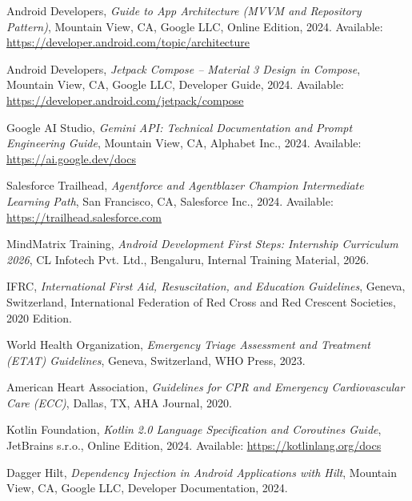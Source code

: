 \documentclass[12pt,a4paper]{report}
\begin{document}
\begin{enumerate}[label={[\arabic*]}, leftmargin=*, itemsep=8pt]
    \item Android Developers, \textit{Guide to App Architecture (MVVM and Repository Pattern)}, Mountain View, CA, Google LLC, Online Edition, 2024. Available: \url{https://developer.android.com/topic/architecture}
    \item Android Developers, \textit{Jetpack Compose -- Material 3 Design in Compose}, Mountain View, CA, Google LLC, Developer Guide, 2024. Available: \url{https://developer.android.com/jetpack/compose}
    \item Google AI Studio, \textit{Gemini API: Technical Documentation and Prompt Engineering Guide}, Mountain View, CA, Alphabet Inc., 2024. Available: \url{https://ai.google.dev/docs}
    \item Salesforce Trailhead, \textit{Agentforce and Agentblazer Champion Intermediate Learning Path}, San Francisco, CA, Salesforce Inc., 2024. Available: \url{https://trailhead.salesforce.com}
    \item MindMatrix Training, \textit{Android Development First Steps: Internship Curriculum 2026}, CL Infotech Pvt. Ltd., Bengaluru, Internal Training Material, 2026.
    \item IFRC, \textit{International First Aid, Resuscitation, and Education Guidelines}, Geneva, Switzerland, International Federation of Red Cross and Red Crescent Societies, 2020 Edition.
    \item World Health Organization, \textit{Emergency Triage Assessment and Treatment (ETAT) Guidelines}, Geneva, Switzerland, WHO Press, 2023.
    \item American Heart Association, \textit{Guidelines for CPR and Emergency Cardiovascular Care (ECC)}, Dallas, TX, AHA Journal, 2020.
    \item Kotlin Foundation, \textit{Kotlin 2.0 Language Specification and Coroutines Guide}, JetBrains s.r.o., Online Edition, 2024. Available: \url{https://kotlinlang.org/docs}
    \item Dagger Hilt, \textit{Dependency Injection in Android Applications with Hilt}, Mountain View, CA, Google LLC, Developer Documentation, 2024.
\end{enumerate}
\end{document}
